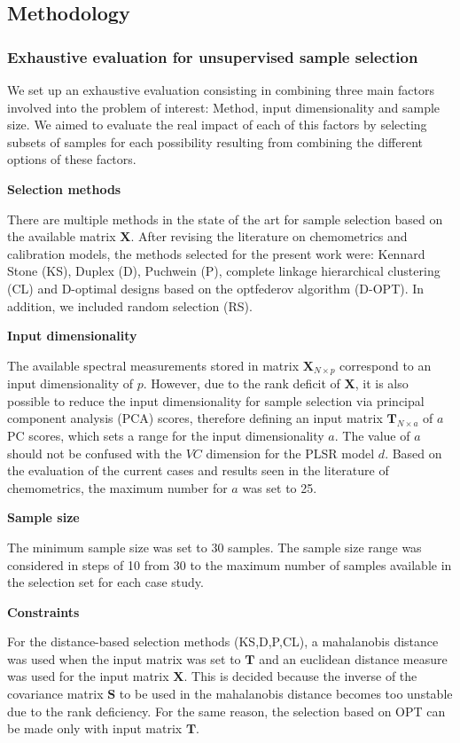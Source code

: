 \documentclass[journal=ancham,manuscript=article]{achemso}
\begin{document}
\subsection*{Methodology}\label{methodology}

\subsubsection*{Exhaustive evaluation for unsupervised sample selection}

We set up an exhaustive evaluation consisting in combining three main factors involved into the problem of interest: Method, input dimensionality and sample size. We aimed to evaluate the real impact of each of this factors by selecting subsets of samples for each possibility resulting from combining the different options of these factors.  

\textbf{Selection methods}

There are multiple methods in the state of the art for sample selection based on the available matrix $\mathbf{X}$. After revising the literature on chemometrics and calibration models, the methods selected for the present work were: Kennard Stone (KS), Duplex (D), Puchwein (P), complete linkage hierarchical clustering (CL) and D-optimal designs based on the optfederov algorithm (D-OPT). In addition, we included random selection (RS). 

\textbf{Input dimensionality}

The available spectral measurements stored in matrix $\mathbf{X}_{N\times p}$ correspond to an input dimensionality of $p$. However, due to the rank deficit of $\mathbf{X}$, it is also possible to reduce the input dimensionality for sample selection via principal component analysis (PCA) scores, therefore defining an input matrix $\mathbf{T}_{N\times a}$ of $a$ PC scores, which sets a range for the input dimensionality $a$. The value of $a$ should not be confused with the $VC$ dimension for the PLSR model $d$. Based on the evaluation of the current cases and results seen in the literature of chemometrics, the maximum number for $a$ was set to 25.

\textbf{Sample size}

The minimum sample size was set to 30 samples. The sample size range was considered in steps of 10 from 30 to the maximum number of samples available in the selection set for each case study. 

\textbf{Constraints}

For the distance-based selection methods (KS,D,P,CL), a mahalanobis distance was used when the input matrix was set to $\mathbf{T}$ and an euclidean distance measure was used for the input matrix $\mathbf{X}$. This is decided because the inverse of the covariance matrix $\mathbf{S}$ to be used in the mahalanobis distance becomes too unstable due to the rank deficiency. For the same reason, the selection based on OPT can be made only with input matrix $\mathbf{T}$. 
\end{document}
